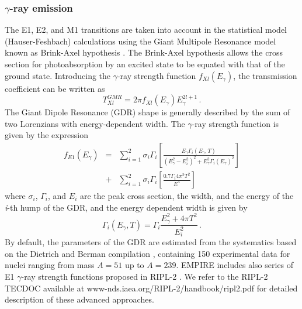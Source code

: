\documentclass[twocolumn,amsmath,amssymb,10pt,groupedaddress,a4paper]{revtex4}
\begin{document}
\subsubsection{$\gamma$-ray emission}
The E1, E2, and M1 transitions are taken into account in the statistical
model (Hauser-Feshbach) calculations using
the Giant Multipole Resonance model known as Brink-Axel hypothesis \cite{Axel,Brink,Brinka}.
The Brink-Axel hypothesis allows the cross section for photoabsorption
by an excited state to be equated with that of the ground state. Introducing
the $\gamma$-ray strength function $f_{Xl}(E_{\gamma})$, the transmission
coefficient can be written as
\begin{equation}
T_{Xl}^{GMR}=2\pi f_{Xl}(E_{\gamma})E_{\gamma}^{2l+1}\,.
\label{tgGMR}
\end{equation}
The Giant Dipole Resonance (GDR) shape is generally described by the
sum of two Lorenzians with energy-dependent width. The $\gamma$-ray
strength function is given by the expression
\noindent
\begin{eqnarray}
f_{E1}(E_{\gamma})&=&\sum_{i=1}^{2}\sigma_{i}\Gamma_{i}\left[\frac{E_{\gamma}\Gamma_{i}(E_{\gamma},T)}{(E_{\gamma}^{2}-E_{i}^{2})^{2}+E_{\gamma}^{2}\Gamma_{i}(E_{\gamma})^{2}}\right]\nonumber\\
&+&\sum_{i=1}^{2}\sigma_{i}\Gamma_{i}\left[\frac{0.7\Gamma_{i}4\pi^{2}T^{2}}{E^{5}}\right]
\label{lorenz}
\end{eqnarray}
\noindent where $\sigma_{i}$, $\Gamma_{i}$, and $E_{i}$ are the peak cross
section, the width, and the energy of the \emph{i}-th hump of the
GDR, and the energy dependent width is given by
\begin{equation}
\Gamma_{i}(E_{\gamma},T)=\Gamma_{i}\frac{E_{\gamma}^{2}+4\pi T^{2}}{E_{i}^{2}}\,.
\end{equation}
By default, the parameters of the GDR are estimated from the systematics
based on the Dietrich and Berman compilation \cite{die88}, containing
150 experimental data for nuclei ranging from mass $A=51$ up to $A=239$.
EMPIRE includes also series of E1 $\gamma$-ray strength functions
proposed in RIPL-2 \cite{RIPL2}. We refer to the RIPL-2 TECDOC available
at www-nds.iaea.org/RIPL-2/handbook/ripl2.pdf for detailed description
of these advanced approaches.
\end{document}

